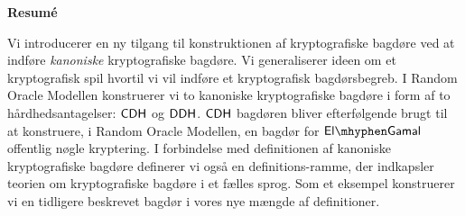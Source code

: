 \pagestyle{plain}
\begin{center}
  \large\textbf{Resum\'{e}}
\end{center}

Vi introducerer en ny tilgang til konstruktionen af kryptografiske bagdøre ved at indføre \emph{kanoniske} kryptografiske bagdøre. Vi generaliserer ideen om et kryptografisk spil hvortil vi vil indføre et kryptografisk bagdørsbegreb. I Random Oracle Modellen konstruerer vi to kanoniske kryptografiske bagdøre i form af to hårdhedsantagelser: $\mathsf{CDH}$ og $\mathsf{DDH}$. $\mathsf{CDH}$ bagdøren bliver efterfølgende brugt til at konstruere, i Random Oracle Modellen, en bagdør for $\elGamal$ offentlig nøgle kryptering. I forbindelse med definitionen af kanoniske kryptografiske bagdøre definerer vi også en definitions-ramme, der indkapsler teorien om kryptografiske bagdøre i et fælles sprog. Som et eksempel konstruerer vi en tidligere beskrevet bagdør i vores nye mængde af definitioner. 

\cleardoublepage
